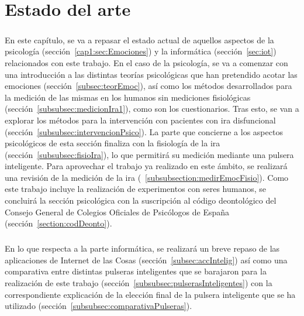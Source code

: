 %
%

\chapter{Estado del arte}
\label{cap1:estadoArte}

\paragraph{}
En este capítulo, se va a repasar el estado actual de aquellos aspectos de la psicología (sección~\ref{cap1:sec:Emociones}) y la informática (sección~\ref{sec:iot}) relacionados con este trabajo. En el caso de la psicología, se va a comenzar con una introducción a las distintas teorías psicológicas que han pretendido acotar las emociones (sección~\ref{subsec:teorEmoc}), así como los métodos desarrollados para la medición de las mismas en los humanos sin mediciones fisiológicas (sección~\ref{subsubsec:medicionIra1}), como son los cuestionarios. Tras esto, se van a explorar los métodos para la intervención con pacientes con ira disfuncional (sección~\ref{subsubsec:intervencionPsico}). La parte que concierne a los aspectos psicológicos de esta sección finaliza con la fisiología de la ira (sección~\ref{subsubsec:fisioIra}), lo que permitirá su medición mediante una pulsera inteligente. Para aprovechar el trabajo ya realizado en este ámbito, se realizará una revisión de la medición de la ira (~\ref{subsubsection:medirEmocFisio}). Como este trabajo incluye la realización de experimentos con seres humanos, se concluirá la sección psicológica con la suscripción al código deontológico del Consejo General de Colegios Oficiales de Psicólogos de España (sección~\ref{section:codDeonto}).

\paragraph{}
En lo que respecta a la parte informática, se realizará un breve repaso de las aplicaciones de Internet de las Cosas (sección~\ref{subsec:accIntelig}) así como una comparativa entre distintas pulseras inteligentes que se barajaron para la realización de este trabajo (sección~\ref{subsubsec:pulserasInteligentes}) con la correspondiente explicación de la elección final de la pulsera inteligente que se ha utilizado (sección~\ref{subsubsec:comparativaPulseras}).


